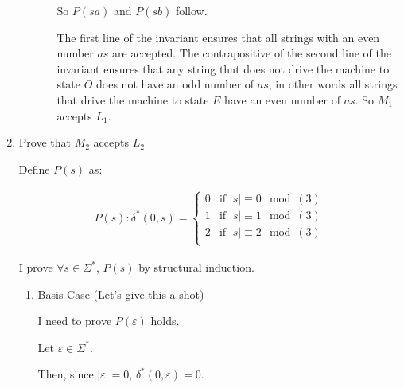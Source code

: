 \documentclass[12pt]{article}
\begin{document}
\begin{enumerate}[1.]
\begin{enumerate}[1.]
\begin{enumerate}[1.]
\begin{mdframed}
            \end{mdframed}

            \bigskip

            So $P(sa)$ and $P(sb)$ follow.

            \bigskip

            The first line of the invariant ensures that all strings with an even number
            $as$ are accepted. The contrapositive of the second line of the invariant
            ensures that any string that does not drive the machine to state $O$ does
            not have an odd number of $as$, in other words all strings that drive
            the machine to state $E$ have an even number of $as$. So $M_1$ accepts $L_1$.

        \end{enumerate}
    \end{enumerate}

    \item Prove that $M_2$ accepts $L_2$

    \bigskip

    Define $P(s)$ as:

    \begin{align}
        P(s): \delta^*(0,s) = \begin{cases}
            0 & \text{if $\vert s \vert \equiv 0 \mod (3)$}\\
            1 & \text{if $\vert s \vert \equiv 1 \mod (3)$}\\
            2 & \text{if $\vert s \vert \equiv 2 \mod (3)$}\\
        \end{cases}
    \end{align}

    I prove $\forall s \in \Sigma^*$, $P(s)$ by structural induction.

    \bigskip

    \begin{enumerate}[1.]
        \item Basis Case (Let's give this a shot)

        \begin{mdframed}
        I need to prove $P(\varepsilon)$ holds.

        \bigskip

        Let $\varepsilon \in \Sigma^*$.

        \bigskip

        Then, since $\vert \varepsilon \vert = 0$, $\delta^*(0,\varepsilon) = 0$.


\end{mdframed}
\end{enumerate}
\end{enumerate}
\end{document}
